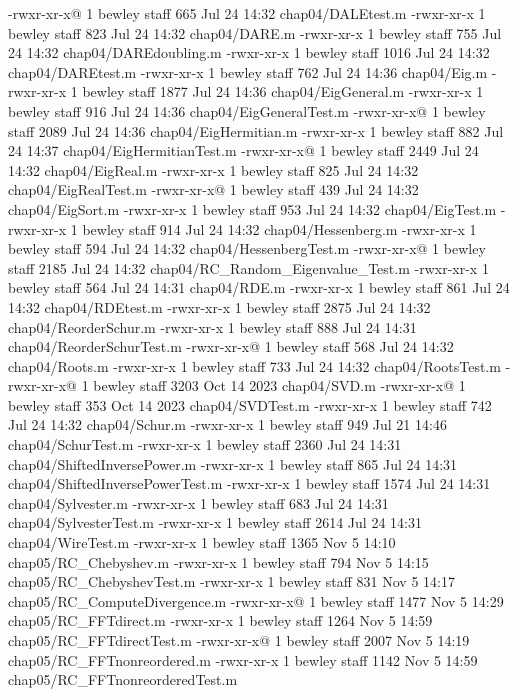 -rwxr-xr-x@ 1 bewley  staff    665 Jul 24 14:32 chap04/DALEtest.m
-rwxr-xr-x  1 bewley  staff    823 Jul 24 14:32 chap04/DARE.m
-rwxr-xr-x  1 bewley  staff    755 Jul 24 14:32 chap04/DAREdoubling.m
-rwxr-xr-x  1 bewley  staff   1016 Jul 24 14:32 chap04/DAREtest.m
-rwxr-xr-x  1 bewley  staff    762 Jul 24 14:36 chap04/Eig.m
-rwxr-xr-x  1 bewley  staff   1877 Jul 24 14:36 chap04/EigGeneral.m
-rwxr-xr-x  1 bewley  staff    916 Jul 24 14:36 chap04/EigGeneralTest.m
-rwxr-xr-x@ 1 bewley  staff   2089 Jul 24 14:36 chap04/EigHermitian.m
-rwxr-xr-x  1 bewley  staff    882 Jul 24 14:37 chap04/EigHermitianTest.m
-rwxr-xr-x@ 1 bewley  staff   2449 Jul 24 14:32 chap04/EigReal.m
-rwxr-xr-x  1 bewley  staff    825 Jul 24 14:32 chap04/EigRealTest.m
-rwxr-xr-x@ 1 bewley  staff    439 Jul 24 14:32 chap04/EigSort.m
-rwxr-xr-x  1 bewley  staff    953 Jul 24 14:32 chap04/EigTest.m
-rwxr-xr-x  1 bewley  staff    914 Jul 24 14:32 chap04/Hessenberg.m
-rwxr-xr-x  1 bewley  staff    594 Jul 24 14:32 chap04/HessenbergTest.m
-rwxr-xr-x@ 1 bewley  staff   2185 Jul 24 14:32 chap04/RC_Random_Eigenvalue_Test.m
-rwxr-xr-x  1 bewley  staff    564 Jul 24 14:31 chap04/RDE.m
-rwxr-xr-x  1 bewley  staff    861 Jul 24 14:32 chap04/RDEtest.m
-rwxr-xr-x  1 bewley  staff   2875 Jul 24 14:32 chap04/ReorderSchur.m
-rwxr-xr-x  1 bewley  staff    888 Jul 24 14:31 chap04/ReorderSchurTest.m
-rwxr-xr-x@ 1 bewley  staff    568 Jul 24 14:32 chap04/Roots.m
-rwxr-xr-x  1 bewley  staff    733 Jul 24 14:32 chap04/RootsTest.m
-rwxr-xr-x@ 1 bewley  staff   3203 Oct 14  2023 chap04/SVD.m
-rwxr-xr-x@ 1 bewley  staff    353 Oct 14  2023 chap04/SVDTest.m
-rwxr-xr-x  1 bewley  staff    742 Jul 24 14:32 chap04/Schur.m
-rwxr-xr-x  1 bewley  staff    949 Jul 21 14:46 chap04/SchurTest.m
-rwxr-xr-x  1 bewley  staff   2360 Jul 24 14:31 chap04/ShiftedInversePower.m
-rwxr-xr-x  1 bewley  staff    865 Jul 24 14:31 chap04/ShiftedInversePowerTest.m
-rwxr-xr-x  1 bewley  staff   1574 Jul 24 14:31 chap04/Sylvester.m
-rwxr-xr-x  1 bewley  staff    683 Jul 24 14:31 chap04/SylvesterTest.m
-rwxr-xr-x  1 bewley  staff   2614 Jul 24 14:31 chap04/WireTest.m
-rwxr-xr-x  1 bewley  staff   1365 Nov  5 14:10 chap05/RC_Chebyshev.m
-rwxr-xr-x  1 bewley  staff    794 Nov  5 14:15 chap05/RC_ChebyshevTest.m
-rwxr-xr-x  1 bewley  staff    831 Nov  5 14:17 chap05/RC_ComputeDivergence.m
-rwxr-xr-x@ 1 bewley  staff   1477 Nov  5 14:29 chap05/RC_FFTdirect.m
-rwxr-xr-x  1 bewley  staff   1264 Nov  5 14:59 chap05/RC_FFTdirectTest.m
-rwxr-xr-x@ 1 bewley  staff   2007 Nov  5 14:19 chap05/RC_FFTnonreordered.m
-rwxr-xr-x  1 bewley  staff   1142 Nov  5 14:59 chap05/RC_FFTnonreorderedTest.m
